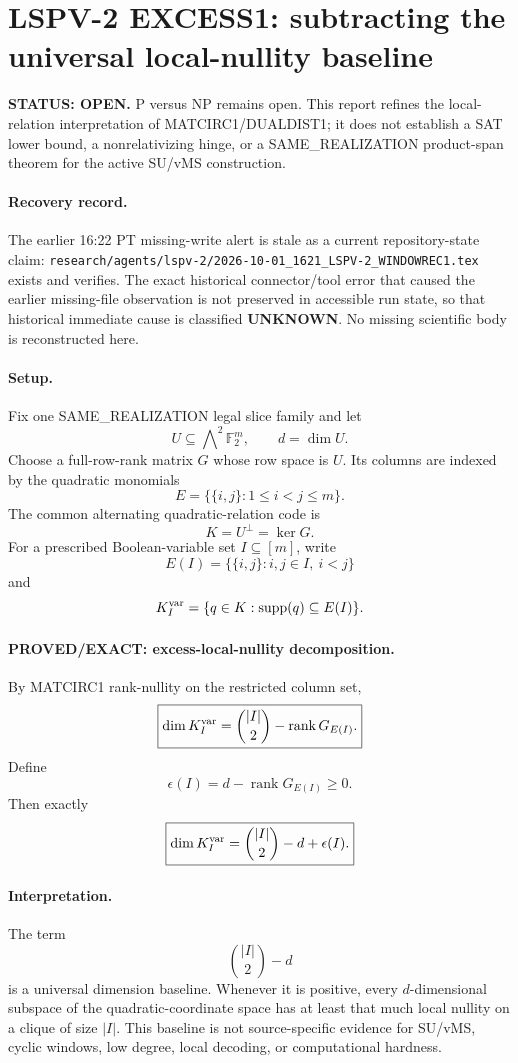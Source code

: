 \documentclass[11pt]{article}
\begin{document}
\section*{LSPV-2 EXCESS1: subtracting the universal local-nullity baseline}

\textbf{STATUS: OPEN.} P versus NP remains open. This report refines the local-relation interpretation of MATCIRC1/DUALDIST1; it does not establish a SAT lower bound, a nonrelativizing hinge, or a SAME\_REALIZATION product-span theorem for the active SU/vMS construction.

\paragraph{Recovery record.}
The earlier 16:22 PT missing-write alert is stale as a current repository-state claim: \texttt{research/agents/lspv-2/2026-10-01\_1621\_LSPV-2\_WINDOWREC1.tex} exists and verifies. The exact historical connector/tool error that caused the earlier missing-file observation is not preserved in accessible run state, so that historical immediate cause is classified \textbf{UNKNOWN}. No missing scientific body is reconstructed here.

\paragraph{Setup.}
Fix one SAME\_REALIZATION legal slice family and let
\[
U\subseteq \bigwedge\nolimits^2\mathbb F_2^m,
\qquad d=\dim U.
\]
Choose a full-row-rank matrix \(G\) whose row space is \(U\). Its columns are indexed by the quadratic monomials
\[
E=\{\{i,j\}:1\le i<j\le m\}.
\]
The common alternating quadratic-relation code is
\[
K=U^\perp=\ker G.
\]
For a prescribed Boolean-variable set \(I\subseteq[m]\), write
\[
E(I)=\{\{i,j\}:i,j\in I,\ i<j\}
\]
and
\[
K_I^{\rm var}
=
\{q\in K:\operatorname{supp}(q)\subseteq E(I)\}.
\]

\paragraph{PROVED/EXACT: excess-local-nullity decomposition.}
By MATCIRC1 rank-nullity on the restricted column set,
\[
\boxed{
\dim K_I^{\rm var}
=
\binom{|I|}{2}
-
\operatorname{rank}G_{E(I)}.
}
\]
Define
\[
\epsilon(I)
=
d-\operatorname{rank}G_{E(I)}\ge0.
\]
Then exactly
\[
\boxed{
\dim K_I^{\rm var}
=
\binom{|I|}{2}-d+\epsilon(I).
}
\]

\paragraph{Interpretation.}
The term
\[
\binom{|I|}{2}-d
\]
is a universal dimension baseline. Whenever it is positive, every \(d\)-dimensional subspace of the quadratic-coordinate space has at least that much local nullity on a clique of size \(|I|\). This baseline is not source-specific evidence for SU/vMS, cyclic windows, low degree, local decoding, or computational hardness.
\end{document}
